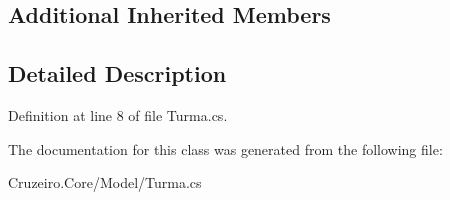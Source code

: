 \subsection*{Additional Inherited Members}


\subsection{Detailed Description}


Definition at line 8 of file Turma.\+cs.



The documentation for this class was generated from the following file\+:\begin{DoxyCompactItemize}
\item 
Cruzeiro.\+Core/\+Model/Turma.\+cs\end{DoxyCompactItemize}
